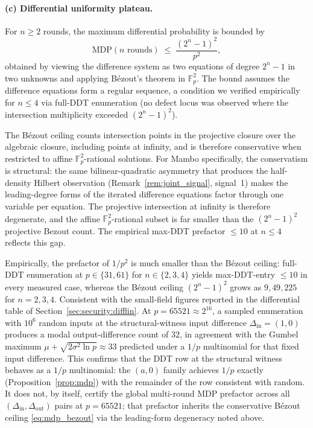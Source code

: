 \documentclass[11pt,a4paper]{article}
\theoremstyle{definition}
\newcommand{\Fp}{\mathbb{F}_p}
\begin{document}
\paragraph{(c) Differential uniformity plateau.}
For $n \ge 2$ rounds, the maximum differential probability is bounded by
\begin{equation}\label{eq:mdp_bezout}
  \mathrm{MDP}(\text{$n$ rounds}) \;\le\; \frac{(2^n - 1)^2}{p^2},
\end{equation}
obtained by viewing the difference system as two equations of degree
$2^n - 1$ in two unknowns and applying B\'ezout's theorem in $\Fp^2$.
The bound assumes the difference equations form a regular sequence, a
condition we verified empirically for $n \le 4$ via full-DDT enumeration
(no defect locus was observed where the intersection multiplicity
exceeded $(2^n-1)^2$).

The B\'ezout ceiling counts intersection points in the projective closure
over the algebraic closure, including points at infinity, and is therefore
conservative when restricted to affine $\Fp^2$-rational solutions. For
Mambo specifically, the conservatism is structural: the same
bilinear-quadratic asymmetry that produces the half-density Hilbert
observation (Remark~\ref{rem:joint_signal}, signal~1) makes the leading-degree
forms of the iterated difference equations factor through one variable per
equation. The projective intersection at infinity is therefore degenerate,
and the affine $\Fp^2$-rational subset is far smaller than the
$(2^n-1)^2$ projective Bezout count. The empirical max-DDT prefactor
$\le 10$ at $n \le 4$ reflects this gap.

Empirically, the prefactor of $1/p^2$ is much smaller than the B\'ezout
ceiling: full-DDT enumeration at $p \in \{31, 61\}$ for $n \in \{2, 3, 4\}$
yields max-DDT-entry $\le 10$ in every measured case, whereas the
B\'ezout ceiling $(2^n-1)^2$ grows as $9, 49, 225$ for $n = 2, 3, 4$.
Consistent with the small-field figures reported in the differential
table of Section~\ref{sec:security:difflin}. At $p = 65521 \approx 2^{16}$,
a sampled enumeration with $10^6$ random inputs at the structural-witness
input difference $\Delta_{\text{in}} = (1, 0)$ produces a modal
output-difference count of $32$, in agreement with the Gumbel maximum
$\mu + \sqrt{2\sigma^2 \ln p} \approx 33$ predicted under a $1/p$
multinomial for that fixed input difference. This confirms that the DDT
row at the structural witness behaves as a $1/p$ multinomial: the
$(a, 0)$ family achieves $1/p$ exactly (Proposition~\ref{prop:mdp})
with the remainder of the row consistent with random. It does not, by
itself, certify the global multi-round MDP prefactor across all
$(\Delta_{\text{in}}, \Delta_{\text{out}})$ pairs at $p = 65521$; that
prefactor inherits the conservative B\'ezout ceiling
\eqref{eq:mdp_bezout} via the leading-form degeneracy noted above.
\end{document}

